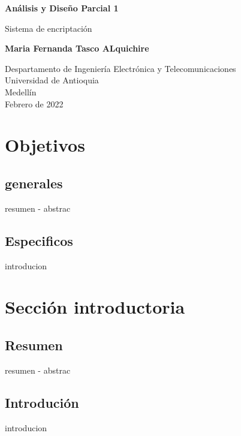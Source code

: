 \documentclass{article}
\begin{document}
\begin{titlepage}
    \begin{center}
        \vspace*{1cm}
            
        \Huge
        \textbf{Análisis y Diseño Parcial 1}
            
        \vspace{0.5cm}
        \LARGE
        Sistema de encriptación 
            
        \vspace{5cm}
            
        \textbf{Maria Fernanda Tasco ALquichire}
            
        \vfill
            
        \vspace{0.8cm}
            
        \Large
        Despartamento de Ingeniería Electrónica y Telecomunicaciones\\
        Universidad de Antioquia\\
        Medellín\\
        Febrero de 2022
            
    \end{center}
\end{titlepage}

\tableofcontents
\newpage

\section{Objetivos}\label{intro1}
\subsection{generales}
resumen - abstrac
\subsection{Especificos}
introducion

\section{Sección introductoria}\label{intro2}
\subsection{Resumen}
resumen - abstrac
\subsection{Introdución}
introducion
\end{document}

